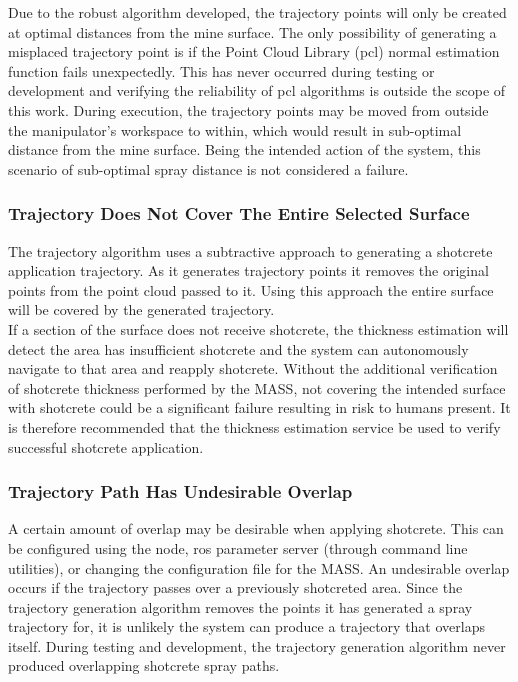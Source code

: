 Due to the robust algorithm developed, the trajectory points will only be created at optimal distances from the mine surface. The only possibility of generating a misplaced trajectory point is if the Point Cloud Library (\acrshort{pcl}) normal estimation function fails unexpectedly. This has never occurred during testing or development and verifying the reliability of \acrshort{pcl} algorithms is outside the scope of this work. During execution, the trajectory points may be moved from outside the manipulator's workspace to within, which would result in sub-optimal distance from the mine surface. Being the intended action of the system, this scenario of sub-optimal spray distance is not considered a failure.\\

\subsubsection{Trajectory Does Not Cover The Entire Selected Surface}

The trajectory algorithm uses a subtractive approach to generating a shotcrete application trajectory. As it generates trajectory points it removes the original points from the point cloud passed to it. Using this approach the entire surface will be covered by the generated trajectory.\\

If a section of the surface does not receive shotcrete, the thickness estimation will detect the area has insufficient shotcrete and the system can autonomously navigate to that area and reapply shotcrete. Without the additional verification of shotcrete thickness performed by the MASS, not covering the intended surface with shotcrete could be a significant failure resulting in risk to humans present. It is therefore recommended that the thickness estimation service be used to verify successful shotcrete application.\\

\subsubsection{Trajectory Path Has Undesirable Overlap}

A certain amount of overlap may be desirable when applying shotcrete. This can be configured using the  node, \acrshort{ros} parameter server (through command line utilities), or changing the configuration file for the MASS. An undesirable overlap occurs if the trajectory passes over a previously shotcreted area. Since the trajectory generation algorithm removes the points it has generated a spray trajectory for, it is unlikely the system can produce a trajectory that overlaps itself. During testing and development, the trajectory generation algorithm never produced overlapping shotcrete spray paths.\\

